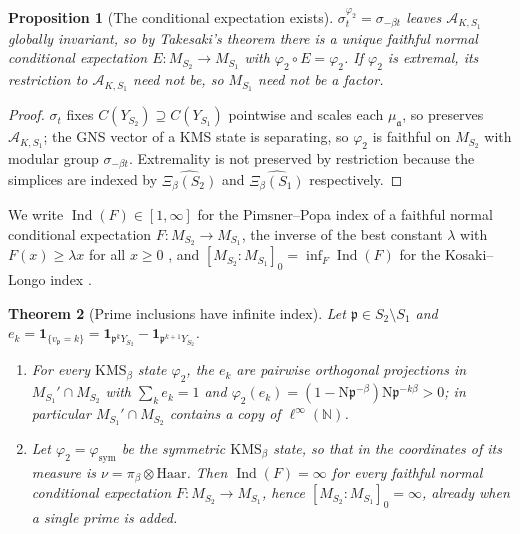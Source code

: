 \documentclass[11pt]{amsart}
\numberwithin{equation}{section}
\newtheorem{theorem}{Theorem}[section]
\newtheorem{proposition}[theorem]{Proposition}
\theoremstyle{definition}
\theoremstyle{remark}
\newcommand{\N}{\mathbb{N}}
\newcommand{\cA}{\mathcal{A}}
\newcommand{\pp}{\mathfrak{p}}
\newcommand{\aaa}{\mathfrak{a}}
\newcommand{\Ns}{\mathrm{N}}
\newcommand{\Ind}{\operatorname{Ind}}
\newcommand{\phisym}{\varphi_{\mathrm{sym}}}
\begin{document}
\begin{proposition}[The conditional expectation exists]\label{prop:E}
$\sigma^{\varphi_2}_t=\sigma_{-\beta t}$ leaves $\cA_{K,S_1}$ globally invariant, so by
Takesaki's theorem \cite{Takesaki} there is a unique faithful normal conditional expectation
$E:M_{S_2}\to M_{S_1}$ with $\varphi_2\circ E=\varphi_2$. If $\varphi_2$ is extremal, its
restriction to $\cA_{K,S_1}$ need not be, so $M_{S_1}$ need not be a factor.
\end{proposition}

\begin{proof}
$\sigma_t$ fixes $C(Y_{S_2})\supseteq C(Y_{S_1})$ pointwise and scales each $\mu_\aaa$, so
preserves $\cA_{K,S_1}$; the GNS vector of a KMS state is separating, so $\varphi_2$ is
faithful on $M_{S_2}$ with modular group $\sigma_{-\beta t}$. Extremality is not preserved by
restriction because the simplices are indexed by $\widehat{\Xi_\beta(S_2)}$ and
$\widehat{\Xi_\beta(S_1)}$ respectively.
\end{proof}

We write $\Ind(F)\in[1,\infty]$ for the Pimsner--Popa index of a faithful normal conditional
expectation $F:M_{S_2}\to M_{S_1}$, the inverse of the best constant $\lambda$ with
$F(x)\ge\lambda x$ for all $x\ge0$ \cite{PP}, and $[M_{S_2}:M_{S_1}]_0=\inf_F\Ind(F)$ for
the Kosaki--Longo index \cite{Kosaki,Longo}.

\begin{theorem}[Prime inclusions have infinite index]\label{thm:infinite}
Let $\pp\in S_2\setminus S_1$ and $e_k=\mathbf 1_{\{v_\pp=k\}}=\mathbf 1_{\pp^kY_{S_2}}-\mathbf 1_{\pp^{k+1}Y_{S_2}}$.
\begin{enumerate}
\item For every $\mathrm{KMS}_\beta$ state $\varphi_2$, the $e_k$ are pairwise orthogonal
projections in $M_{S_1}'\cap M_{S_2}$ with $\sum_ke_k=1$ and
$\varphi_2(e_k)=(1-\Ns\pp^{-\beta})\Ns\pp^{-k\beta}>0$; in particular $M_{S_1}'\cap M_{S_2}$
contains a copy of $\ell^\infty(\N)$.
\item Let $\varphi_2=\phisym$ be the symmetric $\mathrm{KMS}_\beta$ state, so that in the
coordinates of \cite[Lem.~2.10]{Main} its measure is $\nu=\pi_\beta\otimes\mathrm{Haar}$.
Then $\Ind(F)=\infty$ for every faithful normal conditional expectation
$F:M_{S_2}\to M_{S_1}$, hence $[M_{S_2}:M_{S_1}]_0=\infty$, already when a single prime is
added.
\end{enumerate}
\end{theorem}
\end{document}

